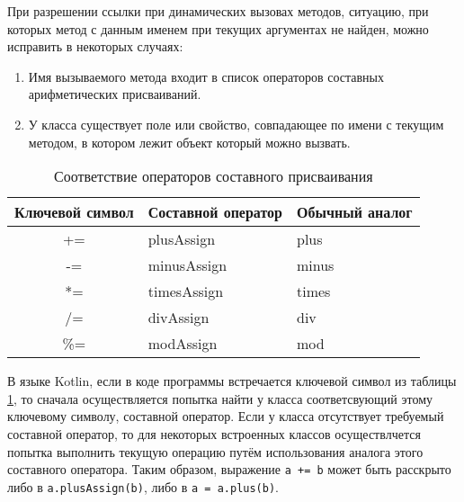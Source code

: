 При разрешении ссылки при динамических вызовах методов, ситуацию, при которых метод с данным именем при текущих аргументах не найден, можно исправить в некоторых случаях:

\begin{enumerate}
    \item Имя вызываемого метода входит в список операторов составных арифметических присваиваний.
    \item У класса существует поле или свойство, совпадающее по имени с текущим методом, в котором лежит объект который можно вызвать.
\end{enumerate}


\begin{table}[h]
\caption{\label{tab:compoundAssignment}Соответствие операторов составного присваивания}
\begin{center}
\begin{tabular}{|c|l|l|}
\hline
Ключевой символ & Составной оператор	& Обычный аналог \\
\hline
+= & plusAssign & plus  \\
-= & minusAssign & minus  \\
*= & timesAssign & times  \\
/= & divAssign & div  \\
\%= & modAssign & mod  \\
\hline
\end{tabular}
\end{center}
\end{table} 

В языке Kotlin, если в коде программы встречается ключевой символ из таблицы \ref{tab:compoundAssignment}, то сначала осуществляется попытка найти у класса соответсвующий этому ключевому символу, составной оператор. Если у класса отсутствует требуемый составной оператор, то для некоторых встроенных классов осуществлчется попытка выполнить текущую операцию путём использования аналога этого составного оператора. Таким образом, выражение \texttt{a += b} может быть расскрыто либо в \texttt{a.plusAssign(b)}, либо в \texttt{a = a.plus(b)}.